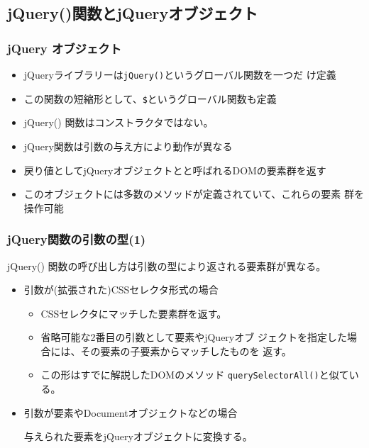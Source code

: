 \subsection{jQuery()関数とjQueryオブジェクト}
\begin{frame}[containsverbatim]
\frametitle{jQuery オブジェクト}
\begin{itemize}
 \item jQueryライブラリーは\texttt{jQuery()}というグローバル関数を一つだ
       け定義
 \item この関数の短縮形として、\texttt{\$}というグローバル関数も定義
 \item jQuery() 関数はコンストラクタではない。
 \item jQuery関数は引数の与え方により動作が異なる
 \item 戻り値としてjQueryオブジェクトとと呼ばれるDOMの要素群を返す
 \item このオブジェクトには多数のメソッドが定義されていて、これらの要素
       群を操作可能
\end{itemize}
\end{frame}
\begin{frame}[containsverbatim]
\frametitle{jQuery関数の引数の型(1)}
jQuery() 関数の呼び出し方は引数の型により返される要素群が異なる。
\begin{itemize}
 \item 引数が(拡張された)CSSセレクタ形式の場合

\begin{itemize}
 \item CSSセレクタにマッチした要素群を返す。
 \item 省略可能な2番目の引数として要素やjQueryオブ
       ジェクトを指定した場合には、その要素の子要素からマッチしたものを
       返す。
 \item この形はすでに解説したDOMのメソッド
       \texttt{querySelectorAll()}と似ている。
\end{itemize}  
 \item 引数が要素やDocumentオブジェクトなどの場合

       与えられた要素をjQueryオブジェクトに変換する。
\end{itemize}
\end{frame}
